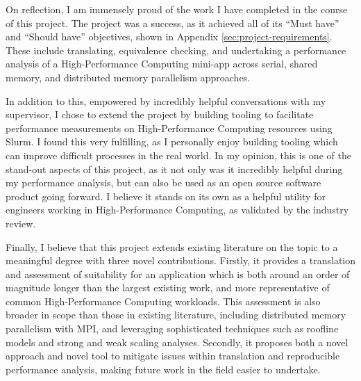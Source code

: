 On reflection, I am immensely proud of the work I have completed in the course of this project. The project was a success, as it achieved all of its ``Must have'' and ``Should have'' objectives, shown in Appendix \ref{sec:project-requirements}. These include translating, equivalence checking, and undertaking a performance analysis of a High-Performance Computing mini-app across serial, shared memory, and distributed memory parallelism approaches.

In addition to this, empowered by incredibly helpful conversations with my supervisor, I chose to extend the project by building tooling to facilitate performance measurements on High-Performance Computing resources using Slurm. I found this very fulfilling, as I personally enjoy building tooling which can improve difficult processes in the real world. In my opinion, this is one of the stand-out aspects of this project, as it not only was it incredibly helpful during my performance analysis, but can also be used as an open source software product going forward. I believe it stands on its own as a helpful utility for engineers working in High-Performance Computing, as validated by the industry review.


Finally, I believe that this project extends existing literature on the topic to a meaningful degree with three novel contributions. Firstly, it provides a translation and assessment of suitability for an application which is both around an order of magnitude longer than the largest existing work, and more representative of common High-Performance Computing workloads. This assessment is also broader in scope than those in existing literature, including distributed memory parallelism with MPI, and leveraging sophisticated techniques such as roofline models and strong and weak scaling analyses. Secondly, it proposes both a novel approach and novel tool to mitigate issues within translation and reproducible performance analysis, making future work in the field easier to undertake.


